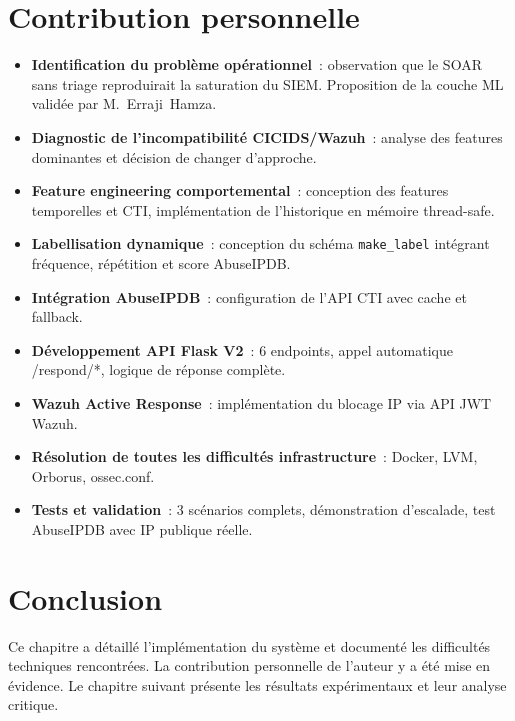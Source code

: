 \documentclass[12pt,a4paper]{report}
\begin{document}
\section{Contribution personnelle}

\begin{tcolorbox}[colback=ColSection!5, colframe=ColSection, arc=4pt,
  boxrule=0.8pt, title={\textbf{Contributions de l'auteur}}]
\begin{itemize}
  \item \textbf{Identification du problème opérationnel}~: observation que le SOAR sans triage reproduirait la saturation du SIEM. Proposition de la couche ML validée par M.~Erraji~Hamza.
  \item \textbf{Diagnostic de l'incompatibilité CICIDS/Wazuh}~: analyse des features dominantes et décision de changer d'approche.
  \item \textbf{Feature engineering comportemental}~: conception des features temporelles et CTI, implémentation de l'historique en mémoire thread-safe.
  \item \textbf{Labellisation dynamique}~: conception du schéma \texttt{make\_label} intégrant fréquence, répétition et score AbuseIPDB.
  \item \textbf{Intégration AbuseIPDB}~: configuration de l'API CTI avec cache et fallback.
  \item \textbf{Développement API Flask V2}~: 6 endpoints, appel automatique /respond/*, logique de réponse complète.
  \item \textbf{Wazuh Active Response}~: implémentation du blocage IP via API JWT Wazuh.
  \item \textbf{Résolution de toutes les difficultés infrastructure}~: Docker, LVM, Orborus, ossec.conf.
  \item \textbf{Tests et validation}~: 3 scénarios complets, démonstration d'escalade, test AbuseIPDB avec IP publique réelle.
\end{itemize}
\end{tcolorbox}

\section*{Conclusion}
Ce chapitre a détaillé l'implémentation du système et documenté
les difficultés techniques rencontrées. La contribution personnelle
de l'auteur y a été mise en évidence. Le chapitre suivant présente
les résultats expérimentaux et leur analyse critique.

\end{document}
